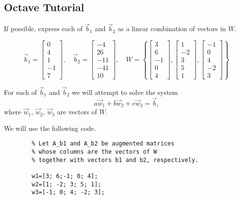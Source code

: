 \documentclass{ximera}
\begin{document}
\subsection*{Octave Tutorial}
\begin{example}\label{ex__oct_span}
    If possible, express each of $\vec{b}_1$ and $\vec{b}_2$ as a linear combination of vectors in $W$.  

    $$\vec{b}_1=\begin{bmatrix}0\\4\\1\\-1\\7\end{bmatrix},\quad \vec{b}_2=\begin{bmatrix}-4\\26\\-11\\-41\\10\end{bmatrix},\quad W=\left\{\begin{bmatrix}3\\6\\-1\\0\\4\end{bmatrix},\begin{bmatrix}1\\-2\\3\\5\\1\end{bmatrix}, \begin{bmatrix}-1\\0\\4\\-2\\3\end{bmatrix}\right\}$$

    \begin{explanation}
        For each of $\vec{b}_1$ and $\vec{b}_2$ we will attempt to solve the system $$a\vec{w}_1+b\vec{w}_2+c\vec{w}_3=\vec{b}_i$$
        where $\vec{w}_1$, $\vec{w}_2$, $\vec{w}_3$ are vectors of $W$.

    We will use the following code. 
    \begin{verbatim}
        % Let A_b1 and A_b2 be augmented matrices 
        % whose columns are the vectors of W
        % together with vectors b1 and b2, respectively.

        w1=[3; 6;-1; 0; 4];
        w2=[1; -2; 3; 5; 1];
        w3=[-1; 0; 4; -2; 3];


\end{verbatim}
\end{explanation}
\end{example}
\end{document}
